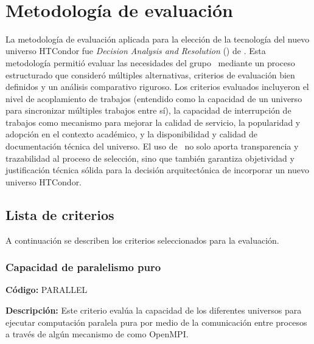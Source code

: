 \label{cap:dar}
\mbox{}\\

\section{Metodología de evaluación}

La metodología de evaluación aplicada para la elección de la tecnología del nuevo universo HTCondor fue \textit{Decision Analysis and Resolution} (\DAR) de \CMMI \citep{CMMIInstitute2010}. Esta metodología permitió evaluar las necesidades del grupo \GRID\ mediante un proceso estructurado que consideró múltiples alternativas, criterios de evaluación bien definidos y un análisis comparativo riguroso. Los criterios evaluados incluyeron el nivel de acoplamiento de trabajos (entendido como la capacidad de un universo para sincronizar múltiples trabajos entre sí), la capacidad de interrupción de trabajos como mecanismo para mejorar la calidad de servicio, la popularidad y adopción en el contexto académico, y la disponibilidad y calidad de documentación técnica del universo. El uso de \DAR\ no solo aporta transparencia y trazabilidad al proceso de selección, sino que también garantiza objetividad y justificación técnica sólida para la decisión arquitectónica de incorporar un nuevo universo HTCondor.

\subsection{Lista de criterios}
A continuación se describen los criterios seleccionados para la evaluación.

\subsubsection{Capacidad de paralelismo puro}
\textbf{Código:} PARALLEL

\textbf{Descripción:} Este criterio evalúa la capacidad de los diferentes universos para ejecutar computación paralela pura por medio de la comunicación entre procesos a través de algún mecanismo de \MPI como OpenMPI.

